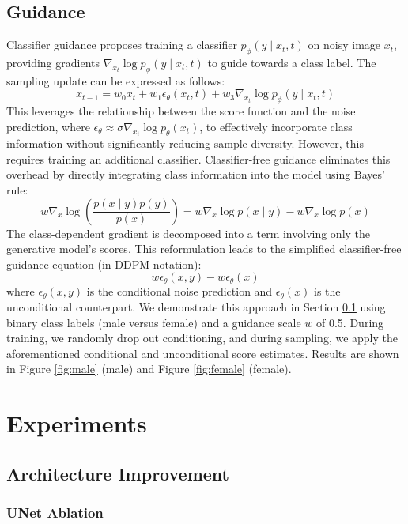 \documentclass[conference]{IEEEtran}
\begin{document}
\subsection{Guidance}\label{guidance}
Classifier guidance \cite{dhariwalDiffusionModelsBeat2021} proposes training a classifier $p_\phi(y \mid x_t, t)$ on noisy image $x_t$, providing gradients $\nabla_{x_t} \log p_\phi(y \mid x_t, t)$  to guide towards a class label. The sampling update can be expressed as follows:
$$
x_{t-1} = w_0 x_t + w_1 \epsilon_\theta(x_t, t) + w_3 \nabla_{x_t} \log p_\phi(y \mid x_t, t)
$$
This leverages the relationship between the score function and the noise prediction, where $\epsilon_\theta \approx \sigma \nabla_{x_t} \log p_\theta(x_t)$, to effectively incorporate class information without significantly reducing sample diversity. However, this requires training an additional classifier. Classifier-free guidance \cite{hoClassifierFreeDiffusionGuidance2022} eliminates this overhead by directly integrating class information into the model using Bayes' rule:
$$
w \nabla_x \log \left(\frac{p(x \mid y) p(y)}{p(x)}\right) = w \nabla_x \log p(x \mid y) - w \nabla_x \log p(x)
$$
The class-dependent gradient is decomposed into a term involving only the generative model’s scores. This reformulation leads to the simplified classifier-free guidance equation (in DDPM notation):
$$
w \epsilon_\theta(x, y) - w \epsilon_\theta(x)
$$
where $\epsilon_\theta(x, y)$ is the conditional noise prediction and $\epsilon_\theta(x)$ is the unconditional counterpart. We demonstrate this approach in Section \ref{guidance} using binary class labels (male versus female) and a guidance scale $w$  of 0.5. During training, we randomly drop out conditioning, and during sampling, we apply the aforementioned conditional and unconditional score estimates. Results are shown in Figure \ref{fig:male} (male) and Figure \ref{fig:female} (female).

\section{Experiments} \label{experiments}

\subsection{Architecture Improvement}\label{e_architecture}

\subsubsection{UNet Ablation}\label{e_unet_ablation}
\end{document}
